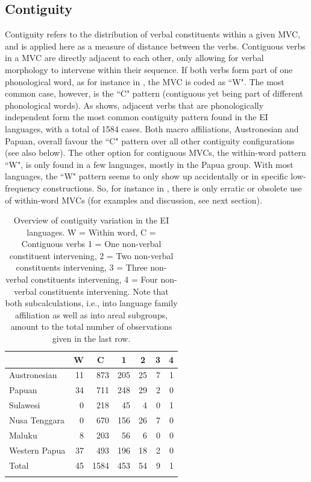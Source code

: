 \subsection{Contiguity}\label{sec:contiguity}

Contiguity refers to the distribution of verbal constituents within a given MVC, and is applied here as a measure of distance between the verbs. Contiguous verbs in a MVC are directly adjacent to each other, only allowing for verbal morphology to intervene within their sequence. If both verbs form part of one phonological word, as for instance in , the MVC is coded as ``W". The most common case, however, is the ``C" pattern (contiguous yet being part of different phonological words). As  shows, adjacent verbs that are phonologically independent form the most common contiguity pattern found in the EI languages, with a total of 1584 cases. Both macro affiliations, Austronesian and Papuan, overall favour the ``C" pattern over all other contiguity configurations (see also  below). The other option for contiguous MVCs, the within-word pattern ``W", is only found in a few languages, mostly in the Papua group. With most languages, the ``W" pattern seems to only show up accidentally or in specific low-frequency constructions. So, for instance in , there is only erratic or obsolete use of within-word MVCs (for examples and discussion, see next section).

\begin{table}
\begin{tabular}{lrrrrrr}
  \lsptoprule
 & \multicolumn{1}{c}{W} & \multicolumn{1}{c}{C} & \multicolumn{1}{c}{1} & \multicolumn{1}{c}{2} & \multicolumn{1}{c}{3} & \multicolumn{1}{c}{4} \tabularnewline 
  \midrule
   Austronesian &   11 & 873 & 205 &  25 &  7 & 1 \tabularnewline 
   Papuan &  34 & 711 & 248 &  29 & 2 & 0 \tabularnewline 
   \midrule
   Sulawesi &   0 & 218 &  45 &   4 &   0 &   1 \tabularnewline
   Nusa Tenggara &   0 & 670 & 156 &  26 &   7 &   0 \tabularnewline
   Maluku &   8 &  203 &  56 &  6 &   0 &   0 \tabularnewline 
   Western Papua &  37 & 493 & 196 &  18 &   2 &   0 \tabularnewline 
   \midrule
   Total & 45 & 1584 & 453 & 54 & 9 & 1 \tabularnewline
\lspbottomrule
\end{tabular}
\caption[Contiguity variation in the EI sample]{Overview of contiguity variation in the EI languages. W = Within word, C = Contiguous verbs 1 = One non-verbal constituent intervening, 2 = Two non-verbal constituents intervening, 3 = Three non-verbal constituents intervening, 4 = Four non-verbal constituents intervening. Note that both subcalculations, i.e., into language family affiliation as well as into areal subgroups, amount to the total number of observations given in the last row.}
\label{table:Contiguity_overview}
\end{table}

